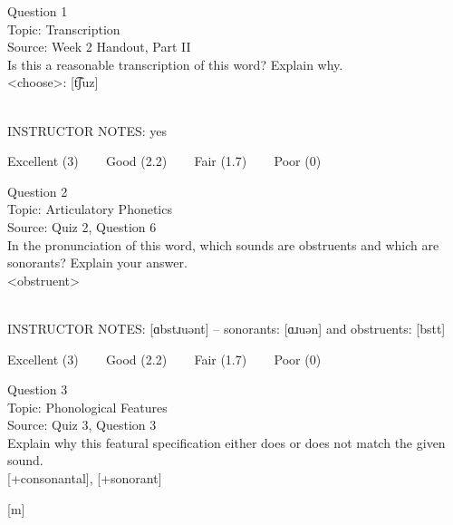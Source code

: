 \documentclass[12pt]{article}
\begin{document}
\begin{center}
\textbf{{\color{blue}{\HUGE START OF EXAM\\}}}

\textbf{{\color{blue}{\HUGE Student ID: 48044\\}}}

\textbf{{\color{blue}{\HUGE \\}}}

\end{center}
\newpage

{\large Question 1}\\

Topic: Transcription\\
Source: Week 2 Handout, Part II\\

Is this a reasonable transcription of this word? Explain why.\\

<choose>: {[t͡ʃuz]}


~\\
INSTRUCTOR NOTES: yes


\vfill
Excellent (3) ~~~ Good (2.2) ~~~ Fair (1.7) ~~~ Poor (0)
\newpage

{\large Question 2}\\

Topic: Articulatory Phonetics\\
Source: Quiz 2, Question 6\\

In the pronunciation of this word, which sounds are obstruents and which are sonorants? Explain your answer.\\

<obstruent>


~\\
INSTRUCTOR NOTES: [ɑbstɹuənt] -- sonorants: [ɑɹuən] and obstruents: [bstt]


\vfill
Excellent (3) ~~~ Good (2.2) ~~~ Fair (1.7) ~~~ Poor (0)
\newpage

{\large Question 3}\\

Topic: Phonological Features\\
Source: Quiz 3, Question 3\\

Explain why this featural specification either does or does not match the given sound.\\

{[+consonantal]}, {[+sonorant]}

{[m]}
\end{document}
